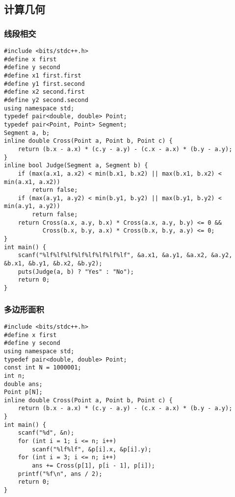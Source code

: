 ﻿\documentclass[a4paper]{article}
\begin{document}
\subsection{计算几何}
\subsubsection{线段相交}
\begin{lstlisting}
#include <bits/stdc++.h>
#define x first
#define y second
#define x1 first.first
#define y1 first.second
#define x2 second.first
#define y2 second.second
using namespace std;
typedef pair<double, double> Point;
typedef pair<Point, Point> Segment;
Segment a, b;
inline double Cross(Point a, Point b, Point c) {
    return (b.x - a.x) * (c.y - a.y) - (c.x - a.x) * (b.y - a.y);
}
inline bool Judge(Segment a, Segment b) {
    if (max(a.x1, a.x2) < min(b.x1, b.x2) || max(b.x1, b.x2) < min(a.x1, a.x2))
        return false;
    if (max(a.y1, a.y2) < min(b.y1, b.y2) || max(b.y1, b.y2) < min(a.y1, a.y2))
        return false;
    return Cross(a.x, a.y, b.x) * Cross(a.x, a.y, b.y) <= 0 &&
           Cross(b.x, b.y, a.x) * Cross(b.x, b.y, a.y) <= 0;
}
int main() {
    scanf("%lf%lf%lf%lf%lf%lf%lf%lf", &a.x1, &a.y1, &a.x2, &a.y2, &b.x1, &b.y1, &b.x2, &b.y2);
    puts(Judge(a, b) ? "Yes" : "No");
    return 0;
}
\end{lstlisting}
\subsubsection{多边形面积}
\begin{lstlisting}
#include <bits/stdc++.h>
#define x first
#define y second
using namespace std;
typedef pair<double, double> Point;
const int N = 1000001;
int n;
double ans;
Point p[N];
inline double Cross(Point a, Point b, Point c) {
    return (b.x - a.x) * (c.y - a.y) - (c.x - a.x) * (b.y - a.y);
}
int main() {
    scanf("%d", &n);
    for (int i = 1; i <= n; i++)
        scanf("%lf%lf", &p[i].x, &p[i].y);
    for (int i = 3; i <= n; i++)
        ans += Cross(p[1], p[i - 1], p[i]);
    printf("%f\n", ans / 2);
    return 0;
}
\end{lstlisting}
\end{document}
